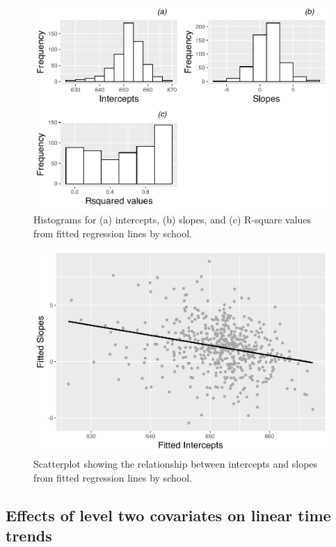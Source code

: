 \documentclass[
]{krantz}
\begin{document}
\begin{figure}

{\centering \includegraphics[width=0.6\linewidth]{bookdown-BeyondMLR_files/figure-latex/lon-histmat1-1} 

}

\caption{ Histograms for (a) intercepts, (b) slopes, and (c) R-square values from fitted regression lines by school.}\label{fig:lon-histmat1}
\end{figure}

\begin{figure}

{\centering \includegraphics[width=0.6\linewidth]{bookdown-BeyondMLR_files/figure-latex/lon-scat5-1} 

}

\caption{Scatterplot showing the relationship between intercepts and slopes from fitted regression lines by school.}\label{fig:lon-scat5}
\end{figure}

\hypertarget{lineartwostageL2effects}{%
\subsection{Effects of level two covariates on linear time trends}\label{lineartwostageL2effects}}
\end{document}
